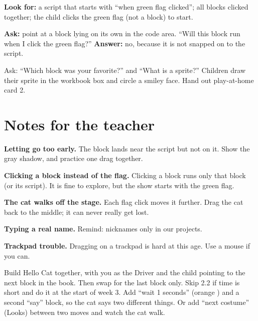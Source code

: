 \begin{formativecheck}
\textbf{Look for:} a script that starts with \enquote{when green flag clicked}; all blocks clicked together; the child clicks the green flag (not a block) to start.

\textbf{Ask:} point at a block lying on its own in the code area. \enquote{Will this block run when I click the green flag?}
\textbf{Answer:} no, because it is not snapped on to the script.
\end{formativecheck}

\begin{reflection}
Ask: \enquote{Which block was your favorite?} and \enquote{What is a sprite?} Children draw their sprite in the workbook box and circle a smiley face. Hand out play-at-home card 2.
\end{reflection}

\section{Notes for the teacher}
\begin{commonmistakes}
  \item \textbf{Letting go too early.} The block lands near the script but not on it. Show the gray shadow, and practice one drag together.
  \item \textbf{Clicking a block instead of the flag.} Clicking a block runs only that block (or its script). It is fine to explore, but the show starts with the green flag.
  \item \textbf{The cat walks off the stage.} Each flag click moves it further. Drag the cat back to the middle; it can never really get lost.
  \item \textbf{Typing a real name.} Remind: nicknames only in our projects.
  \item \textbf{Trackpad trouble.} Dragging on a trackpad is hard at this age. Use a mouse if you can.
\end{commonmistakes}

\begin{differentiation}
\supportpath Build Hello Cat together, with you as the Driver and the child pointing to the next block in the book. Then swap for the last block only. Skip 2.2 if time is short and do it at the start of week 3.
\extensionpath Add \enquote{wait 1 seconds} (orange ) and a second \enquote{say} block, so the cat says two different things. Or add \enquote{next costume} (Looks) between two moves and watch the cat walk.
\end{differentiation}

